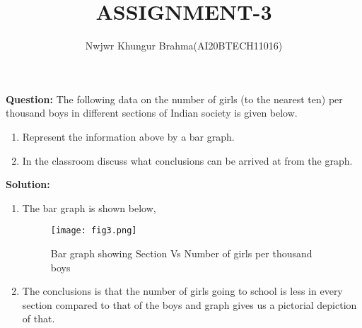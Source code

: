 \documentclass[journal,12pt,twocolumn]{IEEEtran}
\begin{document}
\vspace{3cm}
\title{ASSIGNMENT-3}
\author{Nwjwr Khungur Brahma(AI20BTECH11016)}
\maketitle
\textbf{Question:}
The following data on the number of girls (to the nearest ten) per thousand boys in different sections of Indian society is given below.
\begin{table}[!ht]
  
\end{table}
\begin{enumerate}
\item Represent the information above by a bar graph.
\item In the classroom discuss what conclusions can be arrived at from the graph.
\end{enumerate}
\textbf{Solution:}
\begin{enumerate}
\item The bar graph is shown below,
\begin{figure}[!ht]
\centering
\texttt{[image: fig3.png]}
\caption{Bar graph showing Section Vs Number of girls per thousand boys}
\end{figure}
\hspace{3cm}
\item The conclusions is that the number of girls going to school is less in every section compared to that of the boys and graph gives us a pictorial depiction of that.
\end{enumerate}
\end{document}
